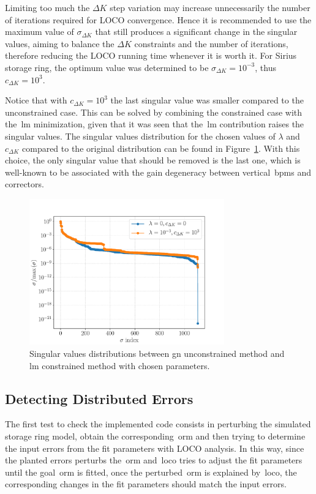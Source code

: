 Limiting too much the $\Delta K$ step variation may increase unnecessarily the number of iterations required for LOCO convergence. Hence it is recommended to use the maximum value of $\sigma_{\Delta K}$ that still produces a significant change in the singular values, aiming to balance the $\Delta K$ constraints and the number of iterations, therefore reducing the LOCO running time whenever it is worth it. For Sirius storage ring, the optimum value was determined to be $\sigma_{\Delta K} = 10^{-3}$, thus $c_{\Delta K} = 10^{3}$.

Notice that with $c_{\Delta K}=10^{3}$ the last singular value was smaller compared to the unconstrained case. This can be solved by combining the constrained case with the~\gls{lm} minimization, given that it was seen that the~\gls{lm} contribution raises the singular values. The singular values distribution for the chosen values of $\lambda$ and $c_{\Delta K}$ compared to the original distribution can be found in Figure~\ref{fig:compare_svs}. With this choice, the only singular value that should be removed is the last one, which is well-known to be associated with the gain degeneracy between vertical~\glspl{bpm} and correctors.
\begin{figure}
\centering
\includegraphics[width=0.75\textwidth]{figures/chosen_singular_values.pdf}
\caption{Singular values distributions between \gls{gn} unconstrained method and \gls{lm} constrained method with chosen parameters.}
\label{fig:compare_svs}
\end{figure}

\subsection{Detecting Distributed Errors}
The first test to check the implemented code consists in perturbing the simulated storage ring model, obtain the corresponding~\gls{orm} and then trying to determine the input errors from the fit parameters with LOCO analysis. In this way, since the planted errors perturbs the~\gls{orm} and~\gls{loco} tries to adjust the fit parameters until the goal~\gls{orm} is fitted, once the perturbed~\gls{orm} is explained by~\gls{loco}, the corresponding changes in the fit parameters should match the input errors. 

